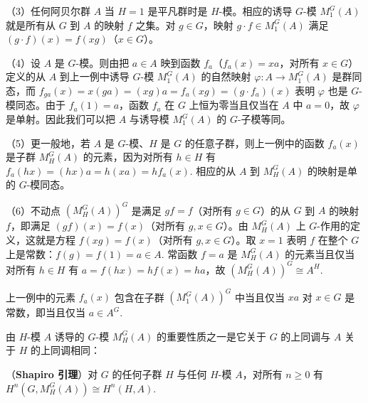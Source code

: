 （3）任何阿贝尔群 \(A\) 当 \(H = 1\) 是平凡群时是 \(H\)-模。相应的诱导 \(G\)-模 \(M_1^G(A)\) 就是所有从 \(G\) 到 \(A\) 的映射 \(f\) 之集。对 \(g \in G\)，映射 \(g \cdot f \in M_1^G(A)\) 满足 \((g \cdot f)(x) = f(xg)\)（\(x \in G\)）。

（4）设 \(A\) 是 \(G\)-模。则由把 \(a \in A\) 映到函数 \(f_a\)（\(f_a(x) = xa\)，对所有 \(x \in G\)）定义的从 \(A\) 到上一例中诱导 \(G\)-模 \(M_1^G(A)\) 的自然映射 \(\varphi : A \to M_1^G(A)\) 是群同态，而 \(f_{ga}(x) = x(ga) = (xg)a = f_a(xg) = (g \cdot f_a)(x)\) 表明 \(\varphi\) 也是 \(G\)-模同态。由于 \(f_a(1) = a\)，函数 \(f_a\) 在 \(G\) 上恒为零当且仅当在 \(A\) 中 \(a = 0\)，故 \(\varphi\) 是单射。因此我们可以把 \(A\) 与诱导模 \(M_1^G(A)\) 的 \(G\)-子模等同。

（5）更一般地，若 \(A\) 是 \(G\)-模、\(H\) 是 \(G\) 的任意子群，则上一例中的函数 \(f_a(x)\) 是子群 \(M_H^G(A)\) 的元素，因为对所有 \(h \in H\) 有 \(f_a(hx) = (hx)a = h(xa) = hf_a(x)\). 相应的从 \(A\) 到 \(M_H^G(A)\) 的映射是单的 \(G\)-模同态。

（6）不动点 \((M_H^G(A))^G\) 是满足 \(gf = f\)（对所有 \(g \in G\)）的从 \(G\) 到 \(A\) 的映射 \(f\)，即满足 \((gf)(x) = f(x)\)（对所有 \(g, x \in G\)）。由 \(M_H^G(A)\) 上 \(G\)-作用的定义，这就是方程 \(f(xg) = f(x)\)（对所有 \(g, x \in G\)）。取 \(x = 1\) 表明 \(f\) 在整个 \(G\) 上是常数：\(f(g) = f(1) = a \in A\). 常函数 \(f = a\) 是 \(M_H^G(A)\) 的元素当且仅当对所有 \(h \in H\) 有 \(a = f(hx) = hf(x) = ha\)，故 \((M_H^G(A))^G \cong A^H\).

上一例中的元素 \(f_a(x)\) 包含在子群 \((M_1^G(A))^G\) 中当且仅当 \(xa\) 对 \(x \in G\) 是常数，即当且仅当 \(a \in A^G\).

由 \(H\)-模 \(A\) 诱导的 \(G\)-模 \(M_H^G(A)\) 的重要性质之一是它关于 \(G\) 的上同调与 \(A\) 关于 \(H\) 的上同调相同：

\begin{proposition}\label{pro:17.23}
（\textbf{Shapiro 引理}）对 \(G\) 的任何子群 \(H\) 与任何 \(H\)-模 \(A\)，对所有 \(n \geq 0\) 有 \(H^n(G, M_H^G(A)) \cong H^n(H, A)\).
\end{proposition}

